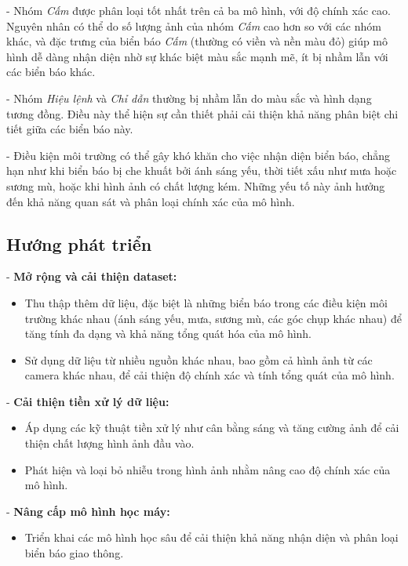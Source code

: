 \documentclass[a4paper,12pt]{article}
\begin{document}
- Nhóm \textit{Cấm} được phân loại tốt nhất trên cả ba mô hình, với độ chính xác cao. Nguyên nhân có thể do số lượng ảnh của nhóm \textit{Cấm} cao hơn so với các nhóm khác, và đặc trưng của biển báo \textit{Cấm} (thường có viền và nền màu đỏ) giúp mô hình dễ dàng nhận diện nhờ sự khác biệt màu sắc mạnh mẽ, ít bị nhầm lẫn với các biển báo khác.
  
- Nhóm \textit{Hiệu lệnh} và \textit{Chỉ dẫn} thường bị nhầm lẫn do màu sắc và hình dạng tương đồng. Điều này thể hiện sự cần thiết phải cải thiện khả năng phân biệt chi tiết giữa các biển báo này.

- Điều kiện môi trường có thể gây khó khăn cho việc nhận diện biển báo, chẳng hạn như khi biển báo bị che khuất bởi ánh sáng yếu, thời tiết xấu như mưa hoặc sương mù, hoặc khi hình ảnh có chất lượng kém. Những yếu tố này ảnh hưởng đến khả năng quan sát và phân loại chính xác của mô hình.

\subsection*{Hướng phát triển}

\hspace{6mm}- \textbf{Mở rộng và cải thiện dataset:}
    \begin{itemize}
        \item Thu thập thêm dữ liệu, đặc biệt là những biển báo trong các điều kiện môi trường khác nhau (ánh sáng yếu, mưa, sương mù, các góc chụp khác nhau) để tăng tính đa dạng và khả năng tổng quát hóa của mô hình.
        \item Sử dụng dữ liệu từ nhiều nguồn khác nhau, bao gồm cả hình ảnh từ các camera khác nhau, để cải thiện độ chính xác và tính tổng quát của mô hình.
    \end{itemize}

- \textbf{Cải thiện tiền xử lý dữ liệu:}
    \begin{itemize}
        \item Áp dụng các kỹ thuật tiền xử lý như cân bằng sáng và tăng cường ảnh để cải thiện chất lượng hình ảnh đầu vào.
        \item Phát hiện và loại bỏ nhiễu trong hình ảnh nhằm nâng cao độ chính xác của mô hình.
    \end{itemize}

- \textbf{Nâng cấp mô hình học máy:}
    \begin{itemize}
        \item Triển khai các mô hình học sâu để cải thiện khả năng nhận diện và phân loại biển báo giao thông.
    \end{itemize}
\end{document}
